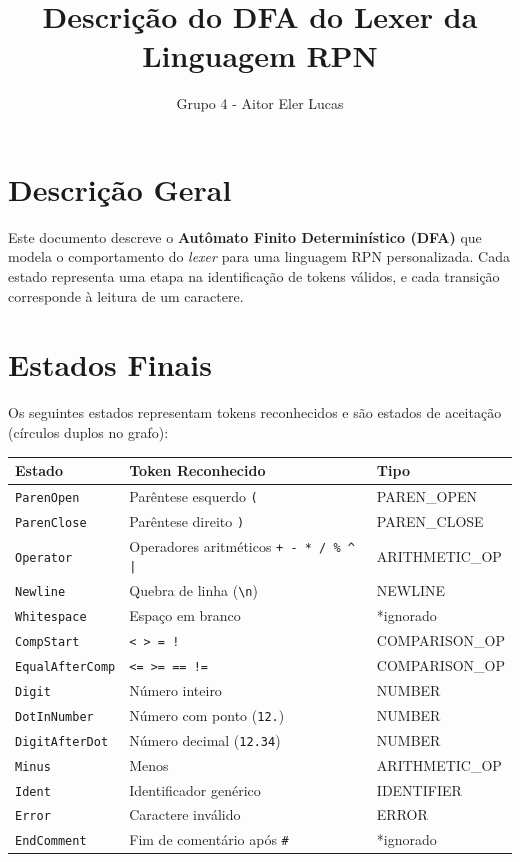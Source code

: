 \documentclass[a4paper,12pt]{article}
\title{Descrição do DFA do Lexer da Linguagem RPN}
\author{Grupo 4 - Aitor Eler Lucas}
\date{}
\begin{document}
\maketitle

\thispagestyle{fancy}

\section*{Descrição Geral}

Este documento descreve o \textbf{Autômato Finito Determinístico (DFA)} que modela o comportamento do \textit{lexer} para uma linguagem RPN personalizada. Cada estado representa uma etapa na identificação de tokens válidos, e cada transição corresponde à leitura de um caractere.

\section*{Estados Finais}

Os seguintes estados representam tokens reconhecidos e são estados de aceitação (círculos duplos no grafo):

\begin{center}
\begin{tabular}{|l|l|l|}
\hline
\textbf{Estado} & \textbf{Token Reconhecido} & \textbf{Tipo} \\
\hline
\texttt{ParenOpen} & Parêntese esquerdo \texttt{(} & PAREN\_OPEN \\
\texttt{ParenClose} & Parêntese direito \texttt{)} & PAREN\_CLOSE \\
\texttt{Operator} & Operadores aritméticos \texttt{+ - * / \% \^{} |} & ARITHMETIC\_OP \\
\texttt{Newline} & Quebra de linha (\texttt{\textbackslash n}) & NEWLINE \\
\texttt{Whitespace} & Espaço em branco & *ignorado \\
\texttt{CompStart} & \texttt{< > = !} & COMPARISON\_OP \\
\texttt{EqualAfterComp} & \texttt{<= >= == !=} & COMPARISON\_OP \\
\texttt{Digit} & Número inteiro & NUMBER \\
\texttt{DotInNumber} & Número com ponto (\texttt{12.}) & NUMBER \\
\texttt{DigitAfterDot} & Número decimal (\texttt{12.34}) & NUMBER \\
\texttt{Minus} & Menos & ARITHMETIC\_OP \\
\texttt{Ident} & Identificador genérico & IDENTIFIER \\
\texttt{Error} & Caractere inválido & ERROR \\
\texttt{EndComment} & Fim de comentário após \texttt{\#} & *ignorado \\
\hline
\end{tabular}
\end{center}
\end{document}
